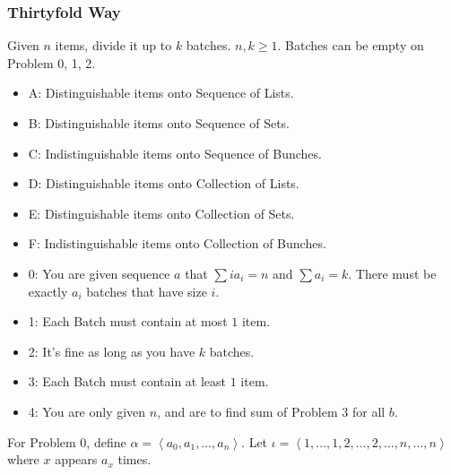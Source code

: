 \subsubsection*{Thirtyfold Way}
Given $n$ items, divide it up to $k$ batches. $n, k \ge 1$. Batches can be empty on Problem 0, 1, 2.
\begin{itemize}
	\item A: Distinguishable items onto Sequence of Lists.
	\item B: Distinguishable items onto Sequence of Sets.
	\item C: Indistinguishable items onto Sequence of Bunches.
	\item D: Distinguishable items onto Collection of Lists.
	\item E: Distinguishable items onto Collection of Sets.
	\item F: Indistinguishable items onto Collection of Bunches.
	\item 0: You are given sequence $a$ that $\sum i a_i = n$ and $\sum a_i = k$. There must be exactly $a_i$ batches that have size $i$.
	\item 1: Each Batch must contain at most $1$ item.
	\item 2: It's fine as long as you have $k$ batches.
	\item 3: Each Batch must contain at least $1$ item.
	\item 4: You are only given $n$, and are to find sum of Problem 3 for all $b$.
\end{itemize}
For Problem 0, define $\alpha = \left< a_0, a_1, \ldots, a_n \right>$. Let $\iota = \left< 1, \ldots, 1, 2, \ldots, 2, \ldots, n, \ldots, n \right>$ where $x$ appears $a_x$ times.

